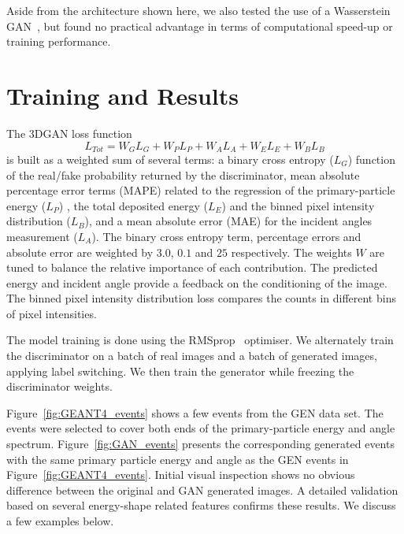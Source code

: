Aside from the architecture shown here, we also tested the use of a Wasserstein GAN~\cite{wgan}, but found no practical advantage in terms of computational speed-up or training performance.

\section{Training and Results}
The 3DGAN loss function
\begin{equation}
    L_{Tot} = W_{G}L_{G} + W_{P}L_{P} + W_{A}L_{A} + W_{E}L_{E} + W_{B}L_{B} 
\label{eq:loss}
\end{equation}
is built as a weighted sum of several terms: a binary cross entropy ($L_{G}$) function of the real/fake probability returned by the discriminator, mean absolute percentage error terms (MAPE) related to the regression of the primary-particle energy ($L_{P}$) , the total deposited energy ($L_{E}$) and the binned pixel intensity distribution ($L_{B}$), and a mean absolute error (MAE) for the incident angles measurement ($L_{A}$). The binary cross entropy term, percentage errors and absolute error are weighted by $3.0$, $0.1$ and $25$ respectively. The weights $W$ are tuned to balance the relative importance of each contribution. The predicted energy and incident angle provide a feedback on the conditioning of the image. The binned pixel intensity distribution loss compares the counts in different bins of pixel intensities. 

The model training is done using the RMSprop~\cite{rmsProp} optimiser. We alternately train the discriminator on a batch of real images and a batch of generated images, applying label switching. We then train the generator while freezing the discriminator weights.

Figure~\ref{fig:GEANT4_events} shows a few events from the GEN data set. The events were selected to cover both ends of the primary-particle energy and angle spectrum. Figure~\ref{fig:GAN_events} presents the corresponding generated events with the same primary particle energy and angle as the GEN events in Figure~\ref{fig:GEANT4_events}. Initial visual inspection shows no obvious difference between the original and GAN generated images. A detailed validation based on several energy-shape related features confirms these results. We discuss a few examples below.

